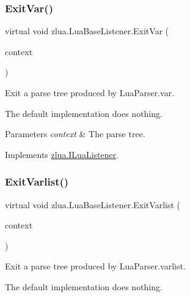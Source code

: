 \subsubsection{\texorpdfstring{Exit\+Var()}{ExitVar()}}
{\footnotesize\ttfamily virtual void zlua.\+Lua\+Base\+Listener.\+Exit\+Var (\begin{DoxyParamCaption}\item[{\mbox{[}\+Not\+Null\mbox{]} \mbox{\hyperlink{classzlua_1_1_lua_parser_1_1_var_context}{Lua\+Parser.\+Var\+Context}}}]{context }\end{DoxyParamCaption})\hspace{0.3cm}{\ttfamily [virtual]}}



Exit a parse tree produced by Lua\+Parser.\+var. 

The default implementation does nothing.


\begin{DoxyParams}{Parameters}
{\em context} & The parse tree.\\
\hline
\end{DoxyParams}


Implements \mbox{\hyperlink{interfacezlua_1_1_i_lua_listener_ab0371ff8288b99ae8fe05ccba2980ee2}{zlua.\+I\+Lua\+Listener}}.

\mbox{\label{classzlua_1_1_lua_base_listener_ad18289513e8ed51c9505bf21aa5c7523}} 
\subsubsection{\texorpdfstring{Exit\+Varlist()}{ExitVarlist()}}
{\footnotesize\ttfamily virtual void zlua.\+Lua\+Base\+Listener.\+Exit\+Varlist (\begin{DoxyParamCaption}\item[{\mbox{[}\+Not\+Null\mbox{]} \mbox{\hyperlink{classzlua_1_1_lua_parser_1_1_varlist_context}{Lua\+Parser.\+Varlist\+Context}}}]{context }\end{DoxyParamCaption})\hspace{0.3cm}{\ttfamily [virtual]}}



Exit a parse tree produced by Lua\+Parser.\+varlist. 

The default implementation does nothing.


